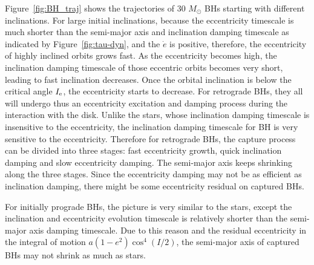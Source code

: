 \documentclass[fleqn,usenatbib]{mnras}
\begin{document}
Figure~\ref{fig:BH_traj} shows the trajectories of 30 $M_\odot$ BHs starting with different inclinations. For large initial inclinations, because the eccentricity timescale is much shorter than the semi-major axis and inclination damping timescale as indicated by Figure~\ref{fig:tau-dyn}, and the $\dot{e}$ is positive, therefore, the eccentricity of highly inclined orbits grows fast. As the eccentricity becomes high, the inclination damping timescale of those eccentric orbits becomes very short, leading to fast inclination decreases. Once the orbital inclination is below the critical angle $I_{\rm e}$, the eccentricity starts to decrease. For retrograde BHs, they all will undergo thus an eccentricity excitation and damping process during the interaction with the disk. Unlike the stars, whose inclination damping timescale is insensitive to the eccentricity, the inclination damping timescale for BH is very sensitive to the eccentricity. Therefore for retrograde BHs, the capture process can be divided into three stages: fast eccentricity growth, quick inclination damping and slow eccentricity damping.  The semi-major axis keeps shrinking along the three stages. Since the eccentricity damping may not be as efficient as inclination damping, there might be some eccentricity residual on captured BHs. 

For initially prograde BHs, the picture is very similar to the stars, except the inclination and eccentricity evolution timescale is relatively shorter than the semi-major axis damping timescale. Due to this reason and the residual eccentricity in the integral of motion $a(1-e^2)\cos^4(I/2)$, the semi-major axis of captured BHs may not shrink as much as stars.
\end{document}

